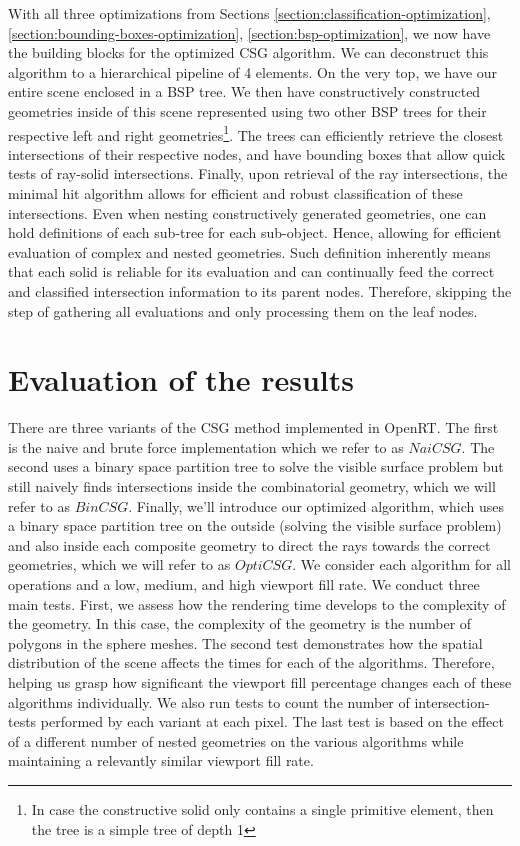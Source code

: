\documentclass[a4paper,11pt,oneside]{article}
\begin{document}
With all three optimizations from Sections \ref{section:classification-optimization}, \ref{section:bounding-boxes-optimization}, \ref{section:bsp-optimization}, we now have the building blocks for the optimized CSG algorithm. We can deconstruct this algorithm to a hierarchical pipeline of 4 elements. On the very top, we have our entire scene enclosed in a BSP tree. We then have constructively constructed geometries inside of this scene represented using two other BSP trees for their respective left and right geometries\footnote{In case the constructive solid only contains a single primitive element, then the tree is a simple tree of depth 1}. The trees can efficiently retrieve the closest intersections of their respective nodes, and have bounding boxes that allow quick tests of ray-solid intersections. Finally, upon retrieval of the ray intersections, the minimal hit algorithm allows for efficient and robust classification of these intersections. Even when nesting constructively generated geometries, one can hold definitions of each sub-tree for each sub-object. Hence, allowing for efficient evaluation of complex and nested geometries.  Such definition inherently means that each solid is reliable for its evaluation and can continually feed the correct and classified intersection information to its parent nodes. Therefore, skipping the step of gathering all evaluations and only processing them on the leaf nodes.

\section{Evaluation of the results}

There are three variants of the CSG method implemented in OpenRT. The first is the naive and brute force implementation which we refer to as $NaiCSG$. The second uses a binary space partition tree to solve the visible surface problem but still naively finds intersections inside the combinatorial geometry, which we will refer to as $BinCSG$. Finally, we'll introduce our optimized algorithm, which uses a binary space partition tree on the outside (solving the visible surface problem) and also inside each composite geometry to direct the rays towards the correct geometries, which we will refer to as $OptiCSG$. We consider each algorithm for all operations and a low, medium, and high viewport fill rate. We conduct three main tests. First, we assess how the rendering time develops to the complexity of the geometry. In this case, the complexity of the geometry is the number of polygons in the sphere meshes. The second test demonstrates how the spatial distribution of the scene affects the times for each of the algorithms. Therefore, helping us grasp how significant the viewport fill percentage changes each of these algorithms individually. We also run tests to count the number of intersection-tests performed by each variant at each pixel. The last test is based on the effect of a different number of nested geometries on the various algorithms while maintaining a relevantly similar viewport fill rate.
\end{document}
